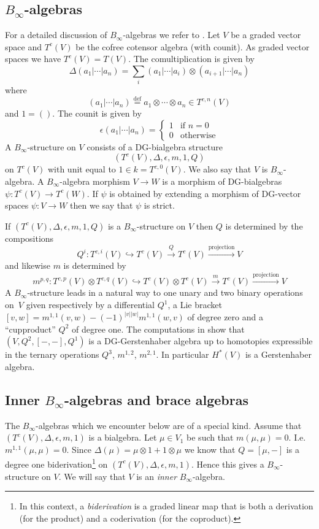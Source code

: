 \documentclass{amsart}
\numberwithin{equation}{section}
\theoremstyle{definition}
\theoremstyle{remark}
\begin{document}
\subsection{$B_\infty$-algebras}
\label{ref-3.1-2}

For a detailed discussion of $B_\infty$-algebras we refer to
\cite[\S5.2]{GJ}. Let $V$ be a graded vector space and $T^c(V)$ be the cofree 
cotensor algebra (with counit).  As graded vector spaces we have $T^c(V)=T(V)$.
The comultiplication is given by
\[
\Delta(a_1|\cdots|a_n)=\sum_i (a_1|\cdots |a_i)\otimes (a_{i+1}|\cdots|a_n)
\]
where
\[
(a_1|\cdots|a_n)\overset{\text{def}}{=}a_1\otimes\cdots\otimes a_n
\in T^{c,n}(V)
\]
and $1=()$. The counit is given by
\[
\epsilon(a_1|\cdots|a_n)=
\begin{cases}
1&\text{if $n=0$}\\
0&\text{otherwise}
\end{cases}
\]
A $B_\infty$-structure on $V$ consists of a DG-bialgebra
structure 
\[
(T^c(V),\Delta,\epsilon,m,1,Q)
\]
on $T^c(V)$ with unit equal to $1\in k=T^{c,0}(V)$. We also say that $V$
is $B_\infty$-algebra. A $B_\infty$-algebra morphism $V\rightarrow W$ is a morphism
of DG-bialgebras $\psi:T^c(V)\rightarrow T^c (W)$. If $\psi$ is obtained by extending
a morphism of DG-vector spaces $\psi:V\rightarrow W$ then we say that $\psi$ is strict. 

If $(T^c(V),\Delta,\epsilon,m,1,Q)$ is a $B_\infty$-structure on $V$ then
$Q$ is determined by the compositions
\[
Q^i:T^{c,i}(V)\hookrightarrow T^{c}(V)\xrightarrow{Q}
T^c(V)\xrightarrow{\text{projection}} V
\]
and likewise $m$ is determined by
\[
m^{p,q}:T^{c,p}(V)\otimes T^{c,q}(V)\hookrightarrow T^{c}(V)\otimes T^{c}(V)
\xrightarrow{m} T^c( V)\xrightarrow{\text{projection}} V
\]
A $B_\infty$-structure leads in a natural way to one unary and two
binary operations on~$V$ given respectively by a differential $Q^1$, a
Lie bracket $[v,w]=m^{1,1}(v,w)-(-1)^{|v||w|}m^{1,1}(w,v)$ of degree
zero and a ``cupproduct'' $Q^2$ of degree one. The computations in
\cite[\S 5.2]{GJ} show that $(V,Q^2,[-,-],Q^1)$ is a DG-Gerstenhaber
algebra up to homotopies expressible in the ternary operations $Q^3$,
$m^{1,2}$, $m^{2,1}$. In particular $H^\ast(V)$ is a Gerstenhaber
algebra.

\subsection{Inner $B_\infty$-algebras and brace algebras}

The $B_\infty$-algebras which we encounter below are of a
special kind.  Assume that $(T^c(V),\Delta,\epsilon,m,1)$ is a bialgebra. Let
$\mu\in V_1$ be such that $m(\mu,\mu)=0$. I.e. $m^{1,1}(\mu,\mu)=0$.
Since $\Delta(\mu)=\mu\otimes 1+1\otimes \mu$ we know that $Q=[\mu,-]$
is a degree one biderivation\footnote{In this context, a {\em biderivation} is a graded 
linear map that is both a derivation (for the product) and a coderivation 
(for the coproduct). } 
on $(T^c(V),\Delta,\epsilon,m,1)$. Hence this gives a
$B_\infty$-structure on $V$. We will say that $V$ is an \emph{inner}
$B_\infty$-algebra.
\end{document}
